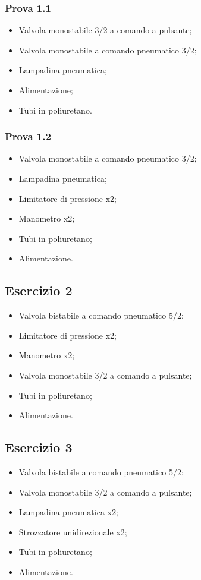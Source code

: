 \documentclass[a4paper]{article}
\begin{document}
\subsubsection{Prova 1.1}
\begin{itemize}
\item Valvola monostabile 3/2 a comando a pulsante;
\item Valvola monostabile a comando pneumatico 3/2;
\item Lampadina pneumatica;
\item Alimentazione;
\item Tubi in poliuretano.
\end{itemize}

\subsubsection{Prova 1.2}
\begin{itemize}
\item Valvola monostabile a comando pneumatico 3/2;
\item Lampadina pneumatica;
\item Limitatore di pressione x2;
\item Manometro x2;
\item Tubi in poliuretano;
\item Alimentazione.
\end{itemize}


\subsection{Esercizio 2}
\begin{itemize}
\item Valvola bistabile a comando pneumatico 5/2;
\item Limitatore di pressione x2;
\item Manometro x2;
\item Valvola monostabile 3/2 a comando a pulsante;
\item Tubi in poliuretano;
\item Alimentazione.
\end{itemize}

\subsection{Esercizio 3}
\begin{itemize}
\item Valvola bistabile a comando pneumatico 5/2;
\item Valvola monostabile 3/2 a comando a pulsante;
\item Lampadina pneumatica x2;
\item Strozzatore unidirezionale x2;
\item Tubi in poliuretano;
\item Alimentazione.
\end{itemize}
\end{document}
